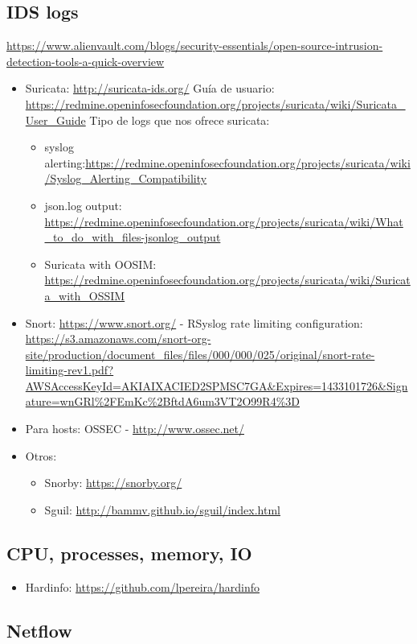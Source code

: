 \documentclass[a4paper,12pt]{article}
\begin{document}
\subsection{IDS logs}
\url{https://www.alienvault.com/blogs/security-essentials/open-source-intrusion-detection-tools-a-quick-overview}
\begin{itemize}
\item Suricata: \url{http://suricata-ids.org/} Guía de usuario: \url{https://redmine.openinfosecfoundation.org/projects/suricata/wiki/Suricata_User_Guide} Tipo de logs que nos ofrece suricata:
  \begin{itemize}
  \item syslog alerting:\url{https://redmine.openinfosecfoundation.org/projects/suricata/wiki/Syslog_Alerting_Compatibility}
  \item json.log output: \url{https://redmine.openinfosecfoundation.org/projects/suricata/wiki/What_to_do_with_files-jsonlog_output}
  \item Suricata with OOSIM: \url{https://redmine.openinfosecfoundation.org/projects/suricata/wiki/Suricata_with_OSSIM}
  \end{itemize}
\item Snort: \url{https://www.snort.org/} - RSyslog rate limiting configuration: \url{https://s3.amazonaws.com/snort-org-site/production/document_files/files/000/000/025/original/snort-rate-limiting-rev1.pdf?AWSAccessKeyId=AKIAIXACIED2SPMSC7GA&Expires=1433101726&Signature=wnGRl\%2FEmKc\%2BftdA6um3VT2O99R4\%3D}
\item Para hosts: OSSEC - \url{http://www.ossec.net/}
\item Otros:
  \begin{itemize}
  \item Snorby: \url{https://snorby.org/}
  \item Sguil: \url{http://bammv.github.io/sguil/index.html}
  \end{itemize}
\end{itemize}

\subsection{CPU, processes, memory, IO}

\begin{itemize}
\item Hardinfo: \url{https://github.com/lpereira/hardinfo}
\end{itemize}

\subsection{Netflow}
\end{document}
